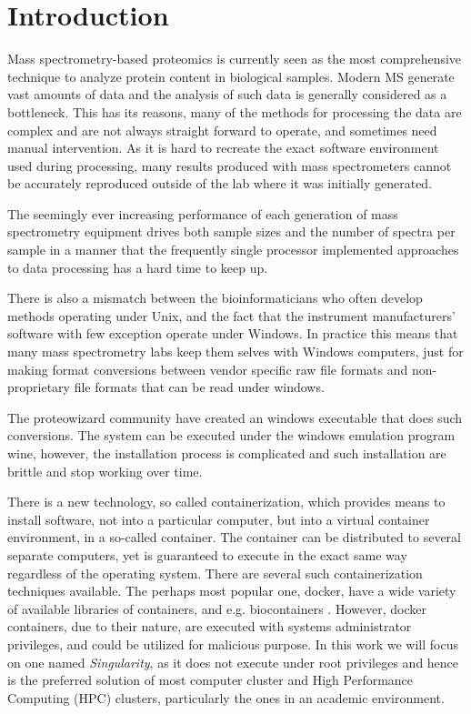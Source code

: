 \documentclass[11pt]{article}
\begin{document}
\section*{Introduction}
Mass spectrometry-based proteomics is currently seen as the most comprehensive technique to analyze protein content in biological samples. Modern MS generate vast amounts of data and the analysis of such data is generally considered as a bottleneck. This has its reasons, many of the methods for processing the data are complex and are not always straight forward to operate, and sometimes need manual intervention. As it is hard to recreate the exact software environment used during processing, many results produced with mass spectrometers cannot be accurately reproduced outside of the lab where it was initially generated.

The seemingly ever increasing performance of each generation of mass spectrometry equipment drives both sample sizes and the number of spectra per sample in a manner that the frequently single processor implemented approaches to data processing has a hard time to keep up.

There is also a mismatch between the bioinformaticians who often develop methods operating under Unix, and the fact that the instrument manufacturers' software with few exception operate under Windows. In practice this means that many mass spectrometry labs keep them selves with Windows computers, just for making format conversions between vendor specific raw file formats and non-proprietary file formats that can be read under windows.

The proteowizard community have created an windows executable that does such conversions\cite{chambers2012cross}. The system can be executed under the windows emulation program wine, however, the installation process is complicated and such installation are brittle and stop working over time.

There is a new technology, so called containerization, which provides means to install software, not into a particular computer, but into a virtual container environment, in a so-called container. The container can be distributed to several separate computers, yet is guaranteed to execute in the exact same way regardless of the operating system. There are several such containerization techniques available. The perhaps most popular one, docker, have a wide variety of available libraries of containers, and e.g. biocontainers \cite{biocontainers}. However, docker containers, due to their nature, are executed with systems administrator privileges, and could be utilized for malicious purpose.  In this work we will focus on one named \textit{Singularity}, as it does not execute under root privileges and hence is the preferred solution of most computer cluster and High Performance Computing (HPC) clusters, particularly the ones in an academic environment.
\end{document}
